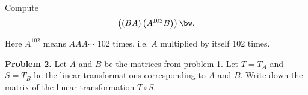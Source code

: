 \documentclass[oneside,12pt]{amsart}
\begin{document}
Compute $$\left((BA) \left(A^{102}  B\right) \right ) \bw.$$

Here $A^{102}$ means
$A A A \cdots$ 102 times, i.e. $A$ multiplied by itself 102 times.

\bigskip
\bigskip
\bigskip
\bigskip
\bigskip
\bigskip

\textbf{Problem 2.} Let $A$ and $B$ be the matrices from problem 1.
Let $T=T_A$ and $S = T_B$ be the linear transformations corresponding to
$A$ and $B$. Write down the matrix of the linear transformation $T \circ S$.
\end{document}
